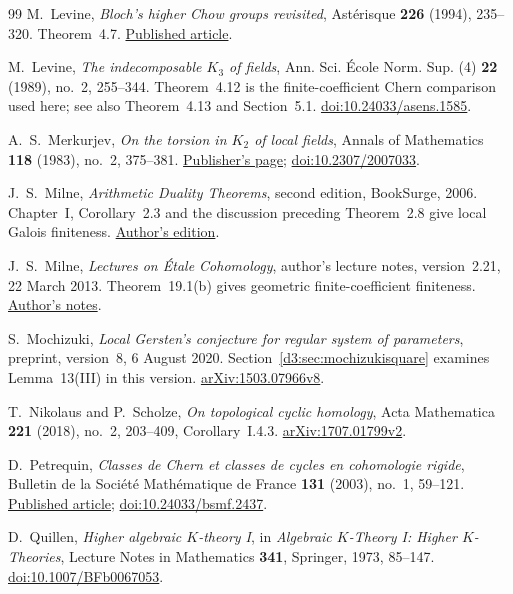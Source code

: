 \begin{thebibliography}{99}
M.~Levine,
\emph{Bloch's higher Chow groups revisited},
Ast\'erisque \textbf{226} (1994), 235--320. Theorem~4.7.
\href{https://www.numdam.org/item/AST_1994__226__235_0/}{Published article}.

M.~Levine, \emph{The indecomposable $K_3$ of fields}, Ann. Sci. \'Ecole Norm. Sup. (4) \textbf{22} (1989), no.~2, 255--344. Theorem~4.12 is the finite-coefficient Chern comparison used here; see also Theorem~4.13 and Section~5.1.
\href{https://doi.org/10.24033/asens.1585}{doi:10.24033/asens.1585}.

A.~S.~Merkurjev, \emph{On the torsion in $K_2$ of local fields}, Annals of Mathematics \textbf{118} (1983), no.~2, 375--381.
\href{https://annals.math.princeton.edu/1983/118-2/p06}{Publisher's page};
\href{https://doi.org/10.2307/2007033}{doi:10.2307/2007033}.

J.~S.~Milne, \emph{Arithmetic Duality Theorems}, second edition, BookSurge, 2006. Chapter~I, Corollary~2.3 and the discussion preceding Theorem~2.8 give local Galois finiteness.
\href{https://www.jmilne.org/math/Books/ADTnot.pdf}{Author's edition}.

J.~S.~Milne, \emph{Lectures on \'Etale Cohomology}, author's lecture notes, version~2.21, 22 March 2013. Theorem~19.1(b) gives geometric finite-coefficient finiteness.
\href{https://www.jmilne.org/math/CourseNotes/LEC.pdf}{Author's notes}.

S.~Mochizuki, \emph{Local Gersten's conjecture for regular system of parameters}, preprint, version~8, 6 August 2020. Section~\ref{d3:sec:mochizukisquare} examines Lemma~13(III) in this version.
\href{https://arxiv.org/abs/1503.07966v8}{arXiv:1503.07966v8}.

T.~Nikolaus and P.~Scholze, \emph{On topological cyclic homology},
Acta Mathematica \textbf{221} (2018), no.~2, 203--409, Corollary~I.4.3.
\href{https://arxiv.org/abs/1707.01799v2}{arXiv:1707.01799v2}.

D.~Petrequin, \emph{Classes de Chern et classes de cycles en
cohomologie rigide}, Bulletin de la Soci\'et\'e Math\'ematique
de France \textbf{131} (2003), no.~1, 59--121.
\href{https://www.numdam.org/article/BSMF_2003__131_1_59_0.pdf}
{Published article};
\href{https://doi.org/10.24033/bsmf.2437}{doi:10.24033/bsmf.2437}.

D.~Quillen, \emph{Higher algebraic $K$-theory I}, in \emph{Algebraic $K$-Theory I: Higher $K$-Theories}, Lecture Notes in Mathematics \textbf{341}, Springer, 1973, 85--147.
\href{https://doi.org/10.1007/BFb0067053}{doi:10.1007/BFb0067053}.


\end{thebibliography}
